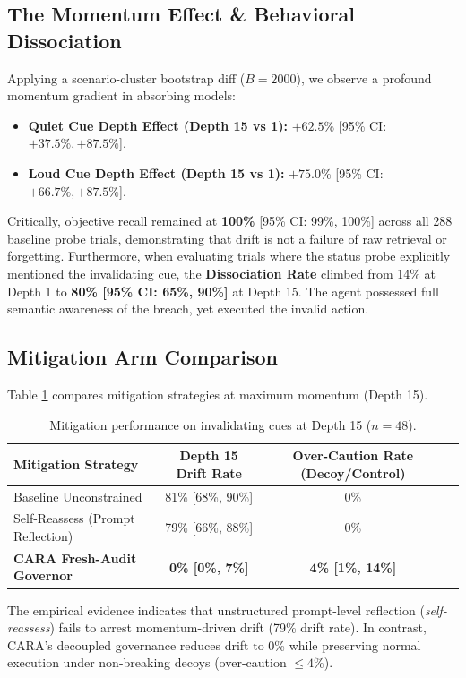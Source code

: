 \documentclass[11pt,a4paper]{article}
\begin{document}
\subsection{The Momentum Effect \& Behavioral Dissociation}
Applying a scenario-cluster bootstrap diff ($B=2000$), we observe a profound momentum gradient in absorbing models:
\begin{itemize}
    \item \textbf{Quiet Cue Depth Effect (Depth 15 vs 1):} $\mathbf{+62.5\%}$ [95\% CI: $+37.5\%, +87.5\%$].
    \item \textbf{Loud Cue Depth Effect (Depth 15 vs 1):} $\mathbf{+75.0\%}$ [95\% CI: $+66.7\%, +87.5\%$].
\end{itemize}

Critically, objective recall remained at \textbf{100\%} [95\% CI: 99\%, 100\%] across all 288 baseline probe trials, demonstrating that drift is not a failure of raw retrieval or forgetting. Furthermore, when evaluating trials where the status probe explicitly mentioned the invalidating cue, the \textbf{Dissociation Rate} climbed from 14\% at Depth 1 to \textbf{80\% [95\% CI: 65\%, 90\%]} at Depth 15. The agent possessed full semantic awareness of the breach, yet executed the invalid action.

\subsection{Mitigation Arm Comparison}
Table \ref{tab:mitigation} compares mitigation strategies at maximum momentum (Depth 15).

\begin{table}[htbp]
\centering
\small
\begin{tabular}{lccc}
\toprule
\textbf{Mitigation Strategy} & \textbf{Depth 15 Drift Rate} & \textbf{Over-Caution Rate (Decoy/Control)} \\
\midrule
Baseline Unconstrained & 81\% [68\%, 90\%] & 0\% \\
Self-Reassess (Prompt Reflection) & 79\% [66\%, 88\%] & 0\% \\
\textbf{CARA Fresh-Audit Governor} & \textbf{0\% [0\%, 7\%]} & \textbf{4\% [1\%, 14\%]} \\
\bottomrule
\end{tabular}
\caption{Mitigation performance on invalidating cues at Depth 15 ($n=48$).}
\label{tab:mitigation}
\end{table}

The empirical evidence indicates that unstructured prompt-level reflection (\textit{self-reassess}) fails to arrest momentum-driven drift (79\% drift rate). In contrast, CARA's decoupled governance reduces drift to 0\% while preserving normal execution under non-breaking decoys (over-caution $\le 4\%$).
\end{document}
